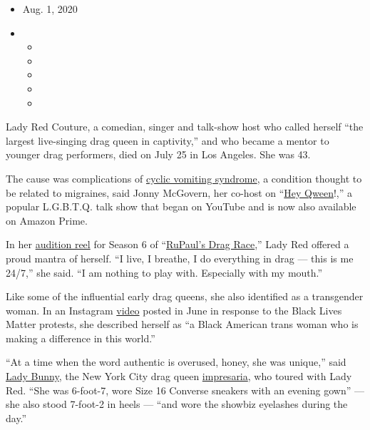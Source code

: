 \begin{itemize}
\item
  Aug. 1, 2020
\item
  \begin{itemize}
  \item
  \item
  \item
  \item
  \item
  \end{itemize}
\end{itemize}

Lady Red Couture, a comedian, singer and talk-show host who called
herself ``the largest live-singing drag queen in captivity,'' and who
became a mentor to younger drag performers, died on July 25 in Los
Angeles. She was 43.

The cause was complications of
\href{https://ghr.nlm.nih.gov/condition/cyclic-vomiting-syndrome\#inheritance}{cyclic
vomiting syndrome}, a condition thought to be related to migraines, said
Jonny McGovern, her co-host on
``\href{https://www.youtube.com/channel/UCStjBZ-91yduQVNtsBkjgJQ}{Hey
Qween}!,'' a popular L.G.B.T.Q. talk show that began on YouTube and is
now also available on Amazon Prime.

In her \href{https://www.youtube.com/watch?v=9R825RVrB78}{audition reel}
for Season 6 of
``\href{https://www.nytimes3xbfgragh.onion/2011/08/07/fashion/at-lunch-with-rupaul-main-course.html?searchResultPosition=11}{RuPaul's
Drag Race},'' Lady Red offered a proud mantra of herself. ``I live, I
breathe, I do everything in drag --- this is me 24/7,'' she said. ``I am
nothing to play with. Especially with my mouth.''

Like some of the influential early drag queens, she also identified as a
transgender woman. In an Instagram
\href{https://www.instagram.com/p/CBO43e4go6R/}{video} posted in June in
response to the Black Lives Matter protests, she described herself as
``a Black American trans woman who is making a difference in this
world.''

``At a time when the word authentic is overused, honey, she was
unique,'' said \href{http://ladybunny.net/}{Lady Bunny}, the New York
City drag queen
\href{https://www.nytimes3xbfgragh.onion/2018/09/29/style/lady-bunny-drag-queen.html?searchResultPosition=1}{impresaria},
who toured with Lady Red. ``She was 6-foot-7, wore Size 16 Converse
sneakers with an evening gown'' --- she also stood 7-foot-2 in heels ---
``and wore the showbiz eyelashes during the day.''

